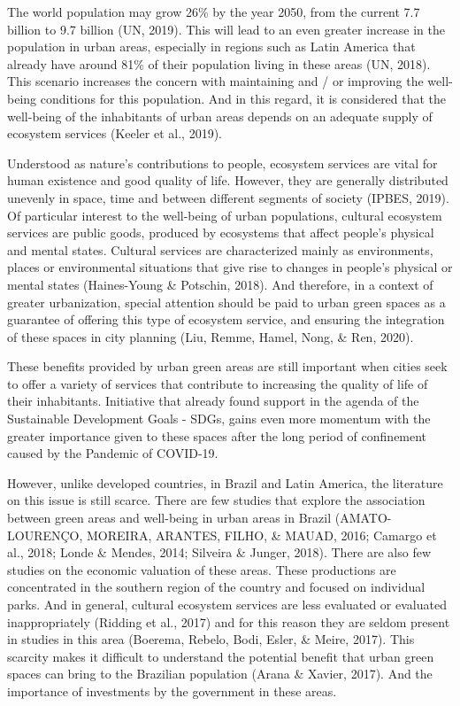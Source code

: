 \documentclass[smallextended]{svjour3}       %
\begin{document}
The world population may grow 26\% by the year 2050, from the current
7.7 billion to 9.7 billion (UN, 2019). This will lead to an even greater
increase in the population in urban areas, especially in regions such as
Latin America that already have around 81\% of their population living
in these areas (UN, 2018). This scenario increases the concern with
maintaining and / or improving the well-being conditions for this
population. And in this regard, it is considered that the well-being of
the inhabitants of urban areas depends on an adequate supply of
ecosystem services (Keeler et al., 2019).

Understood as nature's contributions to people, ecosystem services are
vital for human existence and good quality of life. However, they are
generally distributed unevenly in space, time and between different
segments of society (IPBES, 2019). Of particular interest to the
well-being of urban populations, cultural ecosystem services are public
goods, produced by ecosystems that affect people's physical and mental
states. Cultural services are characterized mainly as environments,
places or environmental situations that give rise to changes in people's
physical or mental states (Haines-Young \& Potschin, 2018). And
therefore, in a context of greater urbanization, special attention
should be paid to urban green spaces as a guarantee of offering this
type of ecosystem service, and ensuring the integration of these spaces
in city planning (Liu, Remme, Hamel, Nong, \& Ren, 2020).

These benefits provided by urban green areas are still important when
cities seek to offer a variety of services that contribute to increasing
the quality of life of their inhabitants. Initiative that already found
support in the agenda of the Sustainable Development Goals - SDGs, gains
even more momentum with the greater importance given to these spaces
after the long period of confinement caused by the Pandemic of COVID-19.

However, unlike developed countries, in Brazil and Latin America, the
literature on this issue is still scarce. There are few studies that
explore the association between green areas and well-being in urban
areas in Brazil (AMATO-LOURENÇO, MOREIRA, ARANTES, FILHO, \& MAUAD,
2016; Camargo et al., 2018; Londe \& Mendes, 2014; Silveira \& Junger,
2018). There are also few studies on the economic valuation of these
areas. These productions are concentrated in the southern region of the
country and focused on individual parks. And in general, cultural
ecosystem services are less evaluated or evaluated inappropriately
(Ridding et al., 2017) and for this reason they are seldom present in
studies in this area (Boerema, Rebelo, Bodi, Esler, \& Meire, 2017).
This scarcity makes it difficult to understand the potential benefit
that urban green spaces can bring to the Brazilian population (Arana \&
Xavier, 2017). And the importance of investments by the government in
these areas.
\end{document}

